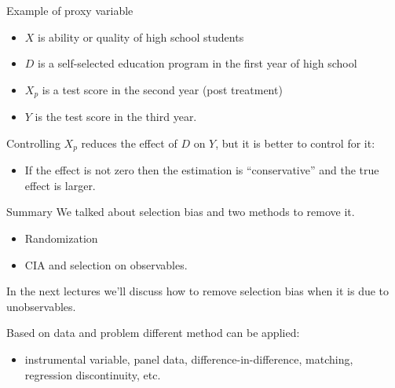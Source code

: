 \documentclass[handout]{beamer}
\begin{document}
\begin{frame}{Example of proxy variable}
\begin{itemize}
\item $X$ is ability or quality of high school students
\item $D$ is a self-selected education program in the first year of high school
\item $X_p$ is a test score in the second year (post treatment)
\item $Y$ is the test score in the third year.
\end{itemize}

Controlling $X_p$ reduces the effect of $D$ on $Y$, but it is better to control for it:
\begin{itemize}
\item If the effect is not zero then the estimation is ``conservative'' and the true effect is larger.
\end{itemize}
\end{frame}


\begin{frame}{Summary}
We talked about selection bias and two methods to remove it.
\begin{itemize}
\item Randomization
\item CIA and selection on observables.
\end{itemize}\bigskip

In the next lectures we'll discuss how to remove selection bias when it is due to unobservables. \bigskip

Based on data and problem different method can be applied: 
\begin{itemize}
\item instrumental variable, panel data, difference-in-difference, matching, regression discontinuity, etc.
\end{itemize} 
\end{frame}


%
%
\end{document}
